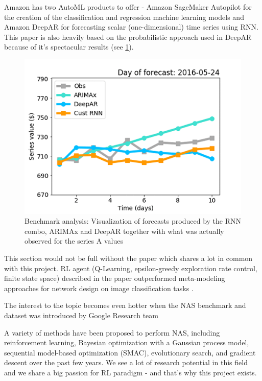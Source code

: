 Amazon has two AutoML products to offer - Amazon SageMaker Autopilot for the creation of the classification and regression machine learning models and Amazon DeepAR for forecasting scalar (one-dimensional) time series using RNN. This paper is also heavily based on the probabilistic approach used in DeepAR because of it’s spectacular results (see \ref{fig:deepar}).

\begin{figure}[]
  \includegraphics[width=\linewidth]{images/deepAr.png}
  \caption{Benchmark analysis: Visualization of forecasts produced by the RNN combo, ARIMAx and DeepAR together with what was actually observed for the series A values}
  \label{fig:deepar}
\end{figure}

This section would not be full without the paper which shares a lot in common with this project. RL agent (Q-Learning, epsilon-greedy exploration rate control, finite state space) described in the paper outperformed meta-modeling approaches for network design on image classification tasks \cite{Baker2016DesigningNN}.

The interest to the topic becomes even hotter when the NAS benchmark and dataset was introduced by Google Research team \cite{pmlr-v97-ying19a}

A variety of methods have been proposed to perform NAS, including reinforcement learning, Bayesian optimization with a Gaussian process model, sequential model-based optimization (SMAC), evolutionary search, and gradient descent over the past few years. We see a lot of research potential in this field and we share a big passion for RL paradigm - and that's why this project exists.

